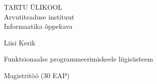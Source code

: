 \documentclass[12pt]{article}
\begin{document}
  \thispagestyle{empty}
  \begin{center}
    \large
      TARTU ÜLIKOOL\\
      Arvutiteaduse instituut\\
      Informaatika õppekava\\

    \vspace{25mm}

    \Large
      Liisi Kerik

    \vspace{4mm}

    \huge
      Funktsionaalse programmeerimiskeele liigisüsteem

    \vspace{20mm}

    \Large
      Magistritöö (30 EAP)
  \end{center}

  \vspace{2mm}
\end{document}
